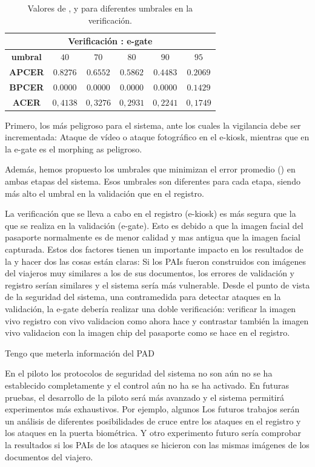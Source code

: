 \begin{table}
\centering
\begin{tabular}{|c|c|c|c|c|c|}
\hline
\multicolumn{6}{|c|}{\textbf{Verificación : \gls{e-gate}}}  \\ \hline
\textbf{umbral} & $40$ & $70$ & $80$ & $90$ & $95$ \\ \hline
\textbf{APCER} & $0.8276$ & $0.6552$ & $0.5862$ & $0.4483$ & $0.2069$ \\ \hline
\textbf{BPCER} & $0.0000$ & $0.0000$ & $0.0000$ & $0.0000$ & $0.1429$ \\ \hline
\textbf{ACER} & $0,4138$ & $0,3276$ & $0,2931$ & $0,2241$ & $0,1749$ \\ \hline
\end{tabular}
\caption{Valores de ,  y  para diferentes umbrales en la verificación.}
\label{tab:resultadosEnVerificacion}
\end{table}

Primero, los más peligroso para el sistema, ante los cuales la vigilancia debe ser incrementada: Ataque de vídeo o ataque fotográfico en el \gls{e-kiosk}, mientras que en la \gls{e-gate} es el \gls{morphing} as peligroso.

Además, hemos propuesto los umbrales que minimizan el error promedio () en ambas etapas del sistema. Esos umbrales son diferentes para cada etapa, siendo más alto el umbral en la validación que en el registro.

La verificación que se lleva a cabo en el registro (\gls{e-kiosk}) es más segura que la que se realiza en la validación (\gls{e-gate}). Esto es debido a que la imagen facial del pasaporte normalmente es de menor calidad y mas antigua que la imagen facial capturada. Estos dos factores tienen un importante impacto en los resultados de la  y hacer dos las cosas están claras: Si los \glspl{PAI} fueron construidos con imágenes del viajeros muy similares a los de sus documentos, los errores de validación y registro serían similares y el sistema sería más vulnerable. Desde el punto de vista de la seguridad del sistema, una contramedida para detectar ataques en la validación, la \gls{e-gate} debería realizar una doble verificación: verificar la imagen \gls{vivo registro} con \gls{vivo validacion} como ahora hace y contrastar también la imagen \gls{vivo validacion} con la imagen \gls{chip} del pasaporte como se hace en el registro.

\color{blue}
Tengo que meterla información del PAD

En el piloto los protocolos de seguridad del sistema no son aún no se ha establecido completamente y el control  aún no ha se ha activado. En futuras pruebas, el desarrollo de la piloto será más avanzado y el sistema permitirá experimentos más exhaustivos. Por ejemplo, algunos Los futuros trabajos serán un análisis de diferentes posibilidades de cruce entre los ataques en el registro y los ataques en la puerta biométrica. Y otro experimento futuro sería comprobar la resultados si los \glspl{PAI} de los ataques se hicieron con las mismas imágenes de los documentos del viajero.
\color{black}

